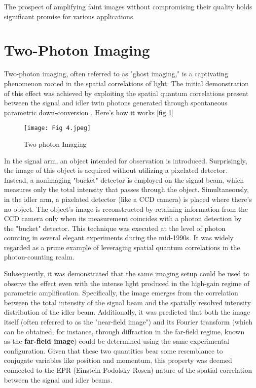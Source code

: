 \documentclass{article}
\begin{document}
The prospect of amplifying faint images without compromising their quality holds significant promise for various applications.

\section{Two-Photon Imaging}
Two-photon imaging, often referred to as "ghost imaging," is a captivating phenomenon rooted in the spatial correlations of light. The initial demonstration of this effect was achieved by exploiting the spatial quantum correlations present between the signal and idler twin photons generated through spontaneous parametric down-conversion \cite{PhysRevLett.74.3600}. Here's how it works [fig \ref{fig:4}]
\begin{figure}[h]
    \centering
    \texttt{[image: Fig 4.jpeg]}
    \caption{Two-photon Imaging}
    \label{fig:4}
\end{figure}

In the signal arm, an object intended for observation is introduced. Surprisingly, the image of this object is acquired without utilizing a pixelated detector. Instead, a nonimaging "bucket" detector is employed on the signal beam, which measures only the total intensity that passes through the object. Simultaneously, in the idler arm, a pixelated detector (like a CCD camera) is placed where there's no object. The object's image is reconstructed by retaining information from the CCD camera only when its measurement coincides with a photon detection by the "bucket" detector. This technique was executed at the level of photon counting in several elegant experiments during the mid-1990s. It was widely regarded as a prime example of leveraging spatial quantum correlations in the photon-counting realm.

Subsequently, it was demonstrated that the same imaging setup could be used to observe the effect even with the intense light produced in the high-gain regime of parametric amplification. Specifically, the image emerges from the correlation between the total intensity of the signal beam and the spatially resolved intensity distribution of the idler beam. Additionally, it was predicted that both the image itself (often referred to as the "near-field image") and its Fourier transform (which can be obtained, for instance, through diffraction in the far-field regime, known as the \textbf{far-field image}) could be determined using the same experimental configuration. Given that these two quantities bear some resemblance to conjugate variables like position and momentum, this property was deemed connected to the EPR (Einstein-Podolsky-Rosen) nature of the spatial correlation between the signal and idler beams.
\end{document}
